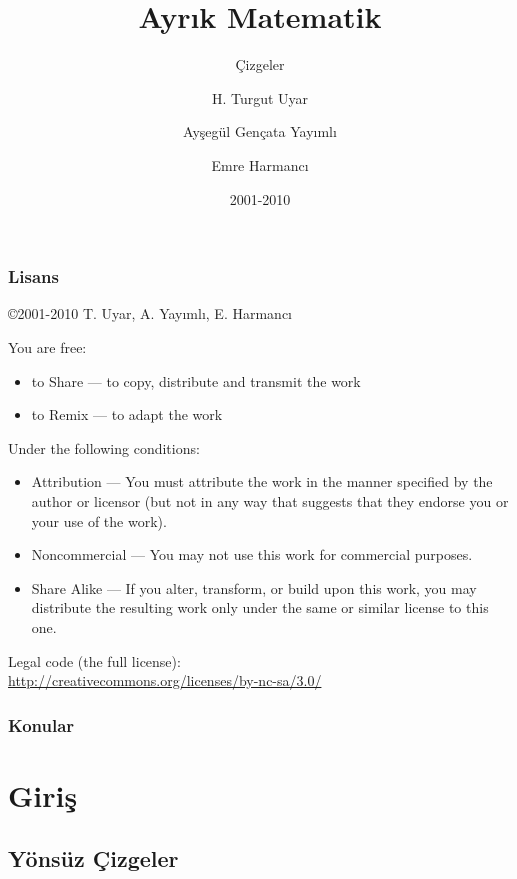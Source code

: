 \documentclass[dvipsnames]{beamer}
\title{Ayrık Matematik}
\subtitle{Çizgeler}
\author{H. Turgut Uyar \and Ayşegül Gençata Yayımlı \and Emre Harmancı}
\date{2001-2010}
\theoremstyle{definition}
\theoremstyle{example}
\theoremstyle{plain}
\begin{document}
\begin{frame}
  \titlepage
\end{frame}

\begin{frame}
  \frametitle{Lisans}

  \hfill
  \copyright 2001-2010 T. Uyar, A. Yayımlı, E. Harmancı

  \vfill
  \begin{tiny}
    You are free:
    \begin{itemize}
      \item to Share — to copy, distribute and transmit the work
      \item to Remix — to adapt the work
    \end{itemize}

    Under the following conditions:
    \begin{itemize}
      \item Attribution — You must attribute the work in the manner specified by
        the author or licensor (but not in any way that suggests that they
        endorse you or your use of the work).

      \item Noncommercial — You may not use this work for commercial purposes.

      \item Share Alike — If you alter, transform, or build upon this work, you
        may distribute the resulting work only under the same or similar license
        to this one.
    \end{itemize}
  \end{tiny}

  \vfill
  Legal code (the full license):\\
  \url{http://creativecommons.org/licenses/by-nc-sa/3.0/}
\end{frame}

\begin{frame}
  \frametitle{Konular}
  \tableofcontents
\end{frame}

\section{Giriş}

\subsection{Yönsüz Çizgeler}
\end{document}
